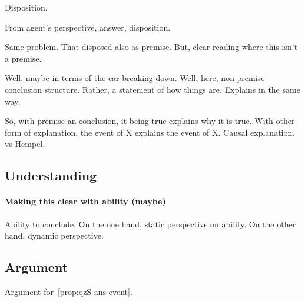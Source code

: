 \begin{note}
  Disposition.

  From agent's perspective, answer, disposition.

  Same problem.
  That disposed also as premise.
  But, clear reading where this isn't a premise.

  Well, maybe in terms of the car breaking down.
  Well, here, non-premise conclusion structure.
  Rather, a statement of how things are.
  Explains in the same way.

  So, with premise an conclusion, it being true explains why it is true.
  With other form of explanation, the event of X explains the event of X.
  Causal explanation.
  \citeauthor{Scriven:1962vq} vs Hempel.
\end{note}


\subsection{Understanding}
\label{sec:understanding}

\paragraph{Making this clear with ability (maybe)}

\begin{note}
  Ability to conclude.
  On the one hand, static perspective on ability.
  On the other hand, dynamic perspective.
\end{note}

\subsection{Argument}
\label{sec:argument-1}

\begin{note}
  Argument for~\autoref{prop:qzS-ans-event}.
\end{note}

